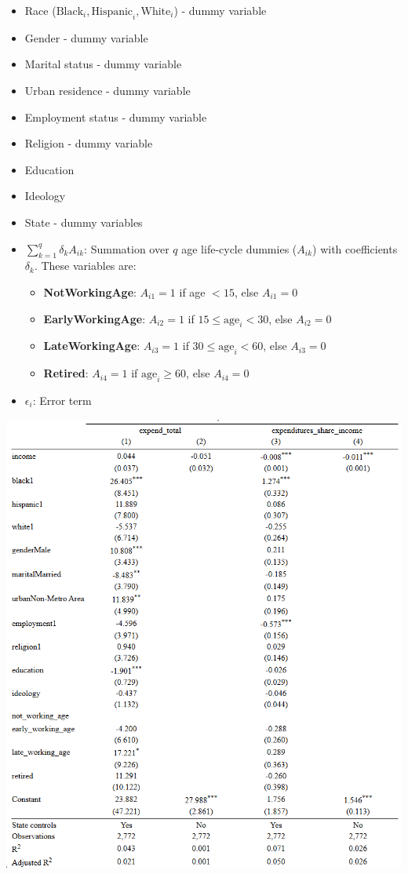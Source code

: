 \documentclass[
  12pt]{article}
\begin{document}
\begin{itemize}
\item
  Race (\(\text{Black}_i, \text{Hispanic}_i, \text{White}_i\)) - dummy
  variable
\item
  Gender - dummy variable
\item
  Marital status - dummy variable
\item
  Urban residence - dummy variable
\item
  Employment status - dummy variable
\item
  Religion - dummy variable
\item
  Education
\item
  Ideology
\item
  State - dummy variables
\item
  \(\sum_{k=1}^{q} \delta_k A_{ik}\): Summation over \(q\) age
  life-cycle dummies (\(A_{ik}\)) with coefficients \(\delta_k\). These
  variables are:

  \begin{itemize}
  \item
    \textbf{NotWorkingAge}: \(A_{i1} = 1\) if age \(< 15\), else
    \(A_{i1} = 0\)
  \item
    \textbf{EarlyWorkingAge}: \(A_{i2} = 1\) if
    \(15 \leq \text{age}_i < 30\), else \(A_{i2} = 0\)
  \item
    \textbf{LateWorkingAge}: \(A_{i3} = 1\) if
    \(30 \leq \text{age}_i < 60\), else \(A_{i3} = 0\)
  \item
    \textbf{Retired}: \(A_{i4} = 1\) if \(\text{age}_i \geq 60\), else
    \(A_{i4} = 0\)
  \end{itemize}
\item
  \(\epsilon_i\): Error term
\end{itemize}

\includegraphics{images/5-01.png}
\end{document}
